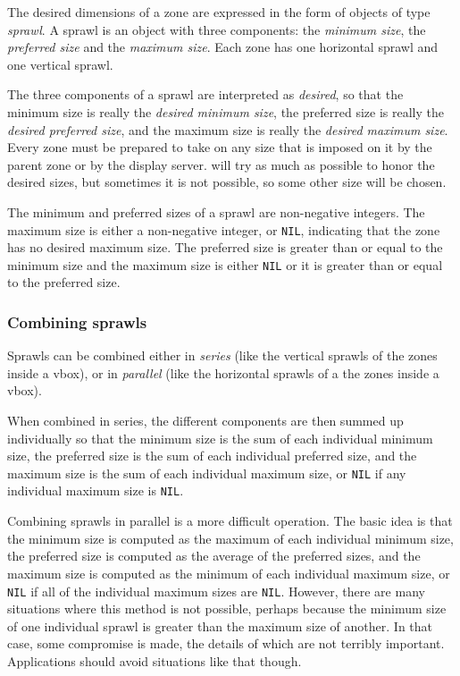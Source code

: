 The desired dimensions of a zone are expressed in the form of objects
of type \emph{sprawl}.  A sprawl is an object with three components:
the \emph{minimum size}, the \emph{preferred size} and the \emph{maximum
  size}.  Each zone has one horizontal sprawl and one vertical sprawl.

The three components of a sprawl are interpreted as \emph{desired}, so
that the minimum size is really the \emph{desired minimum size}, the
preferred size is really the \emph{desired preferred size}, and the
maximum size is really the \emph{desired maximum size}.  Every zone
must be prepared to take on any size that is imposed on it by the
parent zone or by the display server.  \clim{} will try as much as
possible to honor the desired sizes, but sometimes it is not possible,
so some other size will be chosen.

The minimum and preferred sizes of a sprawl are non-negative
integers.  The maximum size is either a non-negative integer, or
\texttt{NIL}, indicating that the zone has no desired maximum size. 
The preferred size is greater than or equal to the minimum size and
the maximum size is either \texttt{NIL} or it is greater than or equal
to the preferred size. 

\subsubsection{Combining sprawls}

Sprawls can be combined either in \emph{series} (like the vertical
sprawls of the zones inside a vbox), or in \emph{parallel} (like the
horizontal sprawls of a the zones inside a vbox).  

When combined in series, the different components are then summed up
individually so that the minimum size is the sum of each individual
minimum size, the preferred size is the sum of each individual
preferred size, and the maximum size is the sum of each individual
maximum size, or \texttt{NIL} if any individual maximum size is
\texttt{NIL}.

Combining sprawls in parallel is a more difficult operation.  The
basic idea is that the minimum size is computed as the maximum of each
individual minimum size, the preferred size is computed as the average
of the preferred sizes, and the maximum size is computed as the
minimum of each individual maximum size, or \texttt{NIL} if all of the
individual maximum sizes are \texttt{NIL}.  However, there are many
situations where this method is not possible, perhaps because the
minimum size of one individual sprawl is greater than the maximum size
of another.  In that case, some compromise is made, the details of
which are not terribly important.  Applications should avoid
situations like that though.

